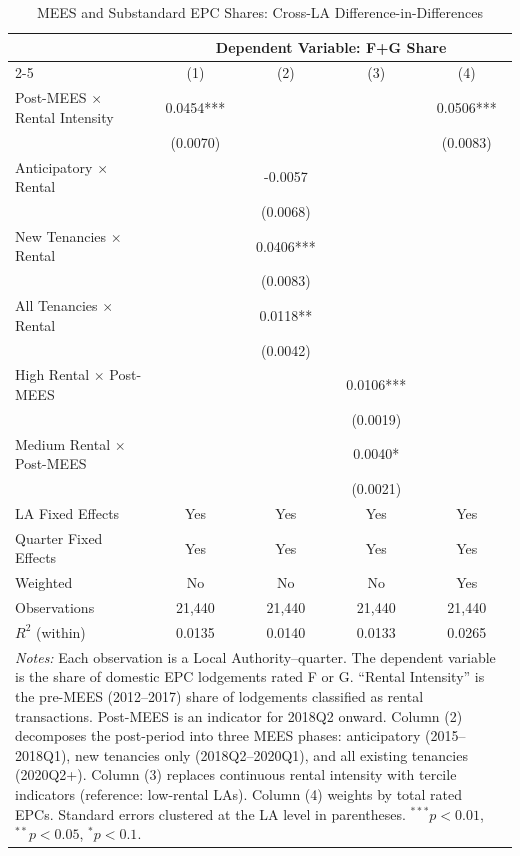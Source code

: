 \begin{table}[t]
\centering
\caption{MEES and Substandard EPC Shares: Cross-LA Difference-in-Differences}
\label{tab:main}
\small
\begin{tabular}{lcccc}
\hline\hline
 & \multicolumn{4}{c}{Dependent Variable: F+G Share} \\
\cmidrule(lr){2-5}
 & (1) & (2) & (3) & (4) \\
\hline
Post-MEES $\times$ Rental Intensity & 0.0454*** & & & 0.0506*** \\
 & (0.0070) & & & (0.0083) \\
[0.5em]
Anticipatory $\times$ Rental & & -0.0057 & & \\
 & & (0.0068) & & \\
New Tenancies $\times$ Rental & & 0.0406*** & & \\
 & & (0.0083) & & \\
All Tenancies $\times$ Rental & & 0.0118** & & \\
 & & (0.0042) & & \\
[0.5em]
High Rental $\times$ Post-MEES & & & 0.0106*** & \\
 & & & (0.0019) & \\
Medium Rental $\times$ Post-MEES & & & 0.0040* & \\
 & & & (0.0021) & \\
\hline
LA Fixed Effects & Yes & Yes & Yes & Yes \\
Quarter Fixed Effects & Yes & Yes & Yes & Yes \\
Weighted & No & No & No & Yes \\
Observations & 21,440 & 21,440 & 21,440 & 21,440 \\
$R^2$ (within) & 0.0135 & 0.0140 & 0.0133 & 0.0265 \\
\hline\hline
\multicolumn{5}{p{0.95\textwidth}}{\scriptsize \textit{Notes:}  Each observation is a Local Authority--quarter. The dependent variable is the share  of domestic EPC lodgements rated F or G. ``Rental Intensity'' is the pre-MEES  (2012--2017) share of lodgements classified as rental transactions. Post-MEES is  an indicator for 2018Q2 onward. Column (2) decomposes the post-period into three  MEES phases: anticipatory (2015--2018Q1), new tenancies only (2018Q2--2020Q1), and  all existing tenancies (2020Q2+). Column (3) replaces continuous rental intensity  with tercile indicators (reference: low-rental LAs). Column (4) weights by total  rated EPCs. Standard errors clustered at the LA level in parentheses.  $^{***}p<0.01$, $^{**}p<0.05$, $^{*}p<0.1$.}
\end{tabular}
\end{table}
